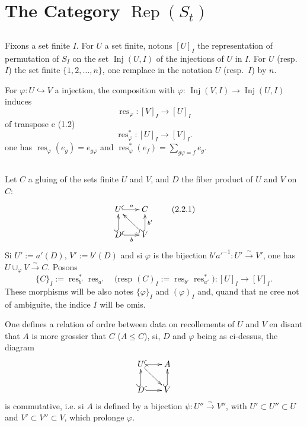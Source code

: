 \documentclass[11pt,a4paper]{article}
\theoremstyle{plain}
\theoremstyle{definition}
\DeclareMathOperator{\Rep}{Rep}
\DeclareMathOperator{\Inj}{Inj}
\DeclareMathOperator{\res}{res}
\newcommand{\isom}{\xrightarrow{\sim}}
\newcommand{\inj}{\hookrightarrow}
\begin{document}
\section{The Category $\Rep(S_t)$}

\subsection{}
Fixons a set finite $I$. For $U$ a set finite, notons $[U]_I$ the representation of permutation of $S_I$ on the set $\Inj(U, I)$ of the injections of $U$ in $I$. For $U$ (resp.~$I$) the set finite $\{1, 2, \ldots, n\}$, one remplace in the notation $U$ (resp.~$I$) by $n$.

For $\varphi : U \inj V$ a injection, the composition with $\varphi$: $\Inj(V, I) \to \Inj(U, I)$ induces
\[
\res_\varphi : [V]_I \to [U]_I
\]
of transpose e (1.2)
\[
\res^*_\varphi : [U]_I \to [V]_I.
\]
one has $\res_\varphi(e_g) = e_{g\varphi}$ and $\res^*_\varphi(e_f) = \sum_{g\varphi = f} e_g$.

\subsection{}
Let $C$ a gluing of the sets finite $U$ and $V$, and $D$ the fiber product of $U$ and $V$ on $C$:
\begin{equation}
\xymatrix@R=1.5pc@C=1.5pc{
U \ar@{^{(}->}[r]^{a} & C \\
D \ar@{^{(}->}[u] \ar@{^{(}->}[r]_{b} & V \ar@{^{(}->}[u]_{b'}
\ar@{^{(}->}[ul]
} \tag{2.2.1}
\end{equation}
Si $U' := a'(D)$, $V' := b'(D)$ and si $\varphi$ is the bijection $b' a'^{-1} : U' \isom V'$, one has $U \cup_\varphi V \isom C$. Posons
\[
\{C\}_I := \res^*_{b'} \res_{a'} \quad \text{(resp } (C)_I := \res_{b'} \res^*_{a'} \text{)} : [U]_I \longrightarrow [V]_I.
\]
These morphisms will be also notes $\{\varphi\}_I$ and $(\varphi)_I$ and, quand that ne cree not of ambiguite, the indice $I$ will be omis.

One defines a relation of ordre between data on recollements of $U$ and $V$ en disant that $A$ is more grossier that $C$ ($A \leq C$), si, $D$ and $\varphi$ being as ci-dessus, the diagram
\[
\xymatrix@R=1.5pc@C=1.5pc{
U \ar@{^{(}->}[r] \ar@{^{(}->}[dr] & A \\
D \ar@{^{(}->}[u] \ar@{^{(}->}[r] & V \ar@{^{(}->}[u]
}
\]
is commutative, i.e. si $A$ is defined by a bijection $\psi : U'' \isom V''$, with $U' \subset U'' \subset U$ and $V' \subset V'' \subset V$, which prolonge $\varphi$.
\end{document}
